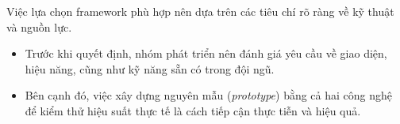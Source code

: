 \begin{flushleft}
  \hspace*{0.8cm}Việc lựa chọn framework phù hợp nên dựa trên các tiêu chí rõ ràng về kỹ thuật và nguồn lực.

  \setlength{\leftmargini}{1.5cm}
  \begin{itemize}
    \item Trước khi quyết định, nhóm phát triển nên đánh giá yêu cầu về giao diện, hiệu năng, cũng như kỹ năng sẵn có trong đội ngũ.
    \item Bên cạnh đó, việc xây dựng nguyên mẫu (\textit{prototype}) bằng cả hai công nghệ để kiểm thử hiệu suất thực tế là cách tiếp cận thực tiễn và hiệu quả.
  \end{itemize}
\end{flushleft}
